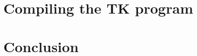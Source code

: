 \section{Compiling the TK program}



\section{Conclusion}

% 

% 
% 
% 
% 
% 




\endinput

\section{Manipulating Terms}
\label{sec:manipulating_terms}

This section describes the basic operations required
for manipulating terms, upon which the optimisation algorithms are built.

